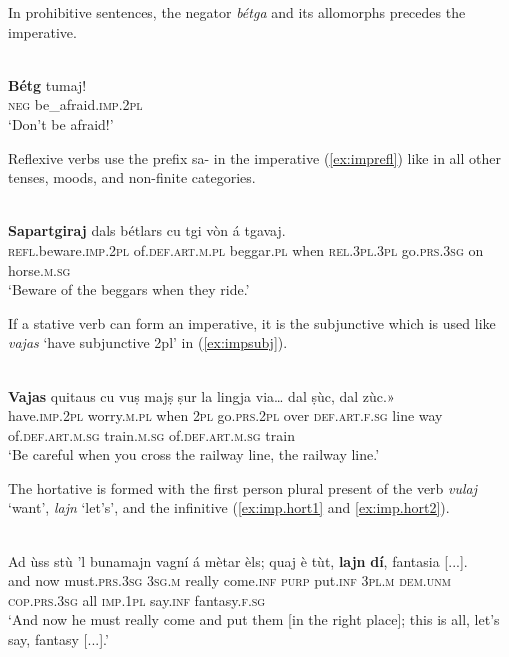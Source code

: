 In prohibitive sentences, the negator \textit{bétga} and its allomorphs precedes the imperative.

\ea
\label{}
\\
\gll  \textbf{Bétg} tumaj!\\
\textsc{neg} be\_afraid.\textsc{imp.2pl}\\
\glt `Don’t be afraid!'
\z

Reflexive verbs use the prefix sa- in the imperative (\ref{ex:imprefl}) like in all other tenses, moods, and non-finite categories.

\ea
\label{ex:imprefl}
\\
\gll  \textbf{Sapartgiraj} dals bétlars cu tgi vòn á tgavaj.  \\
\textsc{refl}.beware.\textsc{imp.2pl} of.\textsc{def.art.m.pl} beggar.\textsc{pl} when \textsc{rel.3pl.3pl} go.\textsc{prs.3sg} on horse.\textsc{m.sg}\\
\glt `Beware of the beggars when they ride.'
\z

If a stative verb can form an imperative, it is the subjunctive which is used like \textit{vajas} `have subjunctive 2pl' in (\ref{ex:impsubj}).

\ea
\label{ex:impsubj}
\\
\gll    \textbf{Vajas} quitaus cu vuṣ majṣ ṣur la lingja via… dal ṣùc, dal zùc.»\\
have.\textsc{imp.2pl} worry.\textsc{m.pl} when \textsc{2pl} go.\textsc{prs.2pl} over \textsc{def.art.f.sg} line way of.\textsc{def.art.m.sg} train.\textsc{m.sg} of.\textsc{def.art.m.sg} train\\
\glt `Be careful when you cross the railway line, the railway line.'
\z

The hortative is formed with the first person plural present of the verb \textit{vulaj} `want', \textit{lajn} `let's', and the infinitive (\ref{ex:imp.hort1} and \ref{ex:imp.hort2}).

\ea
\label{ex:imp.hort1}
\\
\gll Ad ùss stù ’l bunamajn vagní á mètar èls; quaj è tùt, \textbf{lajn} \textbf{dí}, fantasia [...]. \\
and now must.\textsc{prs.3sg} \textsc{3sg.m} really come.\textsc{inf} \textsc{purp} put.\textsc{inf} \textsc{3pl.m} \textsc{dem.unm} \textsc{cop.prs.3sg} all \textsc{imp.1pl} say.\textsc{inf} fantasy.\textsc{f.sg}\\
\glt `And now he must really come and put them [in the right place]; this is all, let’s say, fantasy [...].'
\z

